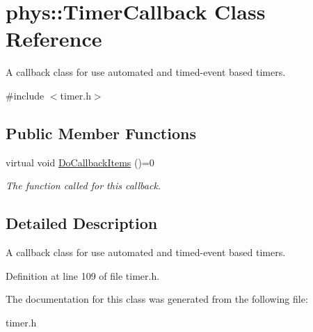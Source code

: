 \hypertarget{classphys_1_1TimerCallback}{
\section{phys::TimerCallback Class Reference}
\label{d1/d18/classphys_1_1TimerCallback}
}


A callback class for use automated and timed-\/event based timers.  




{\ttfamily \#include $<$timer.h$>$}

\subsection*{Public Member Functions}
\begin{DoxyCompactItemize}
\item 
\hypertarget{classphys_1_1TimerCallback_a8ceb51cd1b902e243e35cff61f4ae9d9}{
virtual void \hyperlink{classphys_1_1TimerCallback_a8ceb51cd1b902e243e35cff61f4ae9d9}{DoCallbackItems} ()=0}
\label{d1/d18/classphys_1_1TimerCallback_a8ceb51cd1b902e243e35cff61f4ae9d9}

\begin{DoxyCompactList}\small\item\em The function called for this callback. \item\end{DoxyCompactList}\end{DoxyCompactItemize}


\subsection{Detailed Description}
A callback class for use automated and timed-\/event based timers. 

Definition at line 109 of file timer.h.



The documentation for this class was generated from the following file:\begin{DoxyCompactItemize}
\item 
timer.h\end{DoxyCompactItemize}
